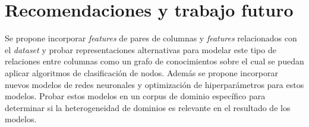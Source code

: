 \documentclass[a4paper,10pt,twocolumn]{article}
\begin{document}
\section{Recomendaciones y trabajo futuro}\label{sec:rec}

Se propone incorporar \textit{features} de pares de columnas y \textit{features} relacionados
con el \textit{dataset} y probar representaciones alternativas para modelar
este tipo de relaciones entre columnas como un grafo de conocimientos sobre el cual se puedan aplicar
algoritmos de clasificaci\'on de nodos. Adem\'as se propone incorporar nuevos modelos de redes neuronales
y optimizaci\'on de hiperpar\'ametros para estos modelos. Probar estos modelos en un corpus de dominio espec\'ifico
para determinar si la heterogeneidad de dominios es relevante en el resultado de los modelos.




	






\label{end}
\end{document}
